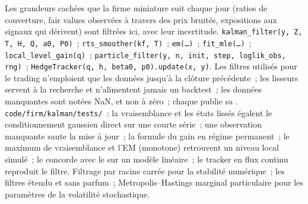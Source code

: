 \begin{build}
 Les grandeurs cachées que la firme miniature suit chaque jour (ratios de couverture, fair values observées à travers des prix bruités, expositions aux signaux qui dérivent) sont
filtrées ici, avec leur incertitude.
 \texttt{kalman\_filter(y, Z, T, H, Q, a0, P0)}~; \texttt{rts\_smoother(kf, T)}~; \texttt{em(\dots)}~; \texttt{fit\_mle(\dots)}~;
\texttt{local\_level\_gain(q)}~; \texttt{particle\_filter(y, n, init, step, loglik\_obs, rng)}~; \texttt{HedgeTracker(q, h, beta0, p0).update(x, y)}.
 Les filtres utilisés pour le trading n'emploient que les données jusqu'à la clôture précédente~; les lisseurs servent à la recherche et n'alimentent jamais un backtest~; les données manquantes sont notées NaN, et non à zéro~;
chaque  publie sa .
 \texttt{code/firm/kalman/tests/}~: la vraisemblance et les états lissés égalent le conditionnement gaussien direct sur une courte série~; une
observation manquante saute la mise à jour~; la formule du gain en régime permanent~; le maximum de vraisemblance et l'EM (monotone) retrouvent un niveau local simulé~; le 
concorde avec le  sur un modèle linéaire~; le tracker en flux continu reproduit le filtre.
 Filtrage par racine carrée pour la stabilité numérique~; les filtres étendu et sans parfum~; Metropolis--Hastings marginal particulaire pour les
paramètres de la volatilité stochastique.
\end{build}

